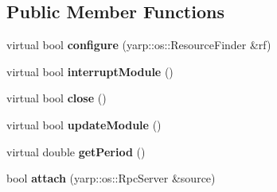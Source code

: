 \subsection*{Public Member Functions}
\begin{DoxyCompactItemize}
\item 
virtual bool {\bfseries configure} (yarp\+::os\+::\+Resource\+Finder \&rf)\label{classhandPoseEstimationModule_af5197dc0855f11f1acc9c346d8db4983}

\item 
virtual bool {\bfseries interrupt\+Module} ()\label{classhandPoseEstimationModule_a09e731bf904a5b3d87e4c1be6a5faa20}

\item 
virtual bool {\bfseries close} ()\label{classhandPoseEstimationModule_a647af57556f324abb187fe89a2939914}

\item 
virtual bool {\bfseries update\+Module} ()\label{classhandPoseEstimationModule_ae15f1e537aeafdba4c15ae8e8a9aa59a}

\item 
virtual double {\bfseries get\+Period} ()\label{classhandPoseEstimationModule_a8f14212e01137285bd05b3f8a2d8b782}

\item 
bool {\bfseries attach} (yarp\+::os\+::\+Rpc\+Server \&source)\label{classhandPoseEstimationModule_a5f806eba28e4a2a7d36269ffb4a49f7c}


\end{DoxyCompactItemize}
